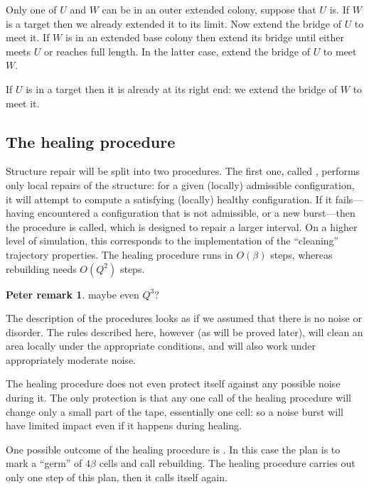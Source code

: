 \documentclass[11pt]{memoir}
\newcommand{\authnote}[3]
{\text{{ \textcolor{#3}{\( \langle\hspace{-0.2em}\langle \)\textsf{\footnotesize #1: #2}\( \rangle\hspace{-0.2em}\rangle \)}}}}
\newcommand{\authnote}[2]{}
\newcommand{\Pnote}[1]{{\authnote{P}{#1}{cyan}}}
\theoremstyle{definition} %
\newtheorem{Premark}{\color{cyan}Peter remark}
\newenvironment{premark}{\begin{Premark}\color{cyan}}{\varqed\end{Premark}}
\renewcommand{\Pnote}[1]{\begin{premark}#1\end{premark}}
\newcommand{\Q}{Q}
\begin{document}
\begin{Proof}
\begin{prooof}
Only one of \( U \) and \( W \) can be in an outer extended colony, suppose that \( U \) is.
If \( W \) is a target then we already extended it to its limit.
Now extend the bridge of \( U \) to meet it.
If \( W \) is in an extended base colony then extend its bridge until either meets \( U \) or
reaches full length.
In the latter case, extend the bridge of \( U \) to meet \( W \).

If \( U \) is in a target then it is already at its right end: we extend the bridge of \( W \) to meet it.
\end{prooof} %
\end{Proof}


\subsection{The healing procedure}\label{sec:healing-proc}

Structure repair will be split into two procedures.
The first one, called , performs
only local repairs of the structure: for a given (locally) admissible configuration,
it will attempt to compute a satisfying (locally) healthy configuration.
If it fails---having encountered a configuration that is not admissible, or
a new burst---then the  procedure is called, which is designed
to repair a larger interval.
On a higher level of simulation, 
this corresponds to the implementation of the ``cleaning'' trajectory properties.
The healing procedure runs in \( O(\beta) \) 
steps, whereas rebuilding needs \( O(\Q^{2}) \) steps. \Pnote{maybe even \( \Q^{3} \)?}

The description of the procedures looks as if we assumed that there is no noise or disorder.
The rules described here, however (as will be proved later), will clean an area locally under the 
appropriate conditions, and will also work under appropriately moderate noise.

The healing procedure does not even protect itself against any possible noise during it.
The only protection is that any one call of the healing procedure will change only 
a small part of the tape, essentially one cell: so a noise burst will have limited impact even if it
happens during healing.

One possible outcome of the healing procedure is . 
In this case the plan is to mark a ``germ'' of \( 4\beta \) cells and call rebuilding.
The healing procedure carries  out only one step of this plan, then it calls itself again.
\end{document}

